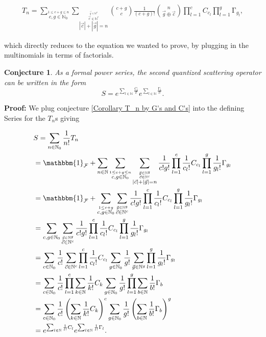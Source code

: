 \documentclass[b5paper,draft,openbib,12pt]{memoir}
\newtheorem{Conj}[Def]{Conjecture}
\newcommand{\id}{\mathbbm{1}}
\begin{document}
\begin{multline}
T_n = \sum_{\stackrel{1\le c+g\le n}{c,g\in\mathbb{N}_0}}
\sum_{\stackrel{\stackrel{\vec{g}\in\mathbb{N}^g}{\vec{c}\in\mathbb{N}^c}}{|\vec{c}| + |\vec{g}|=n}} 
\binom{c+g}{c} \frac{1}{(c+g)!} \binom{n}{\vec{g}\oplus \vec{c}}
\prod_{l=1}^c  C_{c_l} \prod_{l=1}^g \mathrm\Gamma_{g_l},
\end{multline}

which directly reduces to the equation we wanted to prove, by plugging in the multinomials in terms of
factorials. 

\begin{Conj}
As a formal power series, the second quantized scattering operator can be written in the form
\begin{equation}\label{Corollary double exp}
S= e^{\sum_{l\in\mathbb{N}} \frac{C_{l}}{l!}}
 e^{\sum_{l\in\mathbb{N}} \frac{\mathrm\Gamma_{l}}{l!}}.
\end{equation}
\end{Conj}
\textbf{Proof:} We plug conjecture \ref{Corollary T_n by G's and C's} into the defining Series for the \(T_n\)s
giving

\begin{align}
&S= \sum_{n\in\mathbb{N}_0} \frac{1}{n!} T_n \\
&=\id_{\mathcal{F}}+ \sum_{n\in\mathbb{N}} \sum_{\stackrel{1\le c+g\le n}{c,g\in\mathbb{N}_0}} 
\sum_{\stackrel{\stackrel{\vec{g}\in\mathbb{N}^g}{\vec{c}\in\mathbb{N}^c}}{|\vec{c}| + |\vec{g}|=n}} 
\frac{1}{c! g!} \prod_{l=1}^c \frac{1}{c_l!} C_{c_l} \prod_{l=1}^g \frac{1}{g_l!} \mathrm\Gamma_{g_l}\\
&=\id_{\mathcal{F}}+  \sum_{\stackrel{1\le c+g }{c,g\in\mathbb{N}_0}} 
\sum_{\stackrel{\vec{g}\in\mathbb{N}^g}{\vec{c}\in\mathbb{N}^c}} 
\frac{1}{c! g!} \prod_{l=1}^c \frac{1}{c_l!} C_{c_l} \prod_{l=1}^g \frac{1}{g_l!} \mathrm\Gamma_{g_l}\\
&=\sum_{c,g\in\mathbb{N}_0}
\sum_{\stackrel{\vec{g}\in\mathbb{N}^g}{\vec{c}\in\mathbb{N}^c}} 
\frac{1}{c! g!} \prod_{l=1}^c \frac{1}{c_l!} C_{c_l} \prod_{l=1}^g \frac{1}{g_l!} \mathrm\Gamma_{g_l}\\
&=\sum_{c\in\mathbb{N}_0} \frac{1}{c!} \sum_{\vec{c}\in\mathbb{N}^c} \prod_{l=1}^c \frac{1}{c_l!} C_{c_l}
\sum_{g\in\mathbb{N}_0} \frac{1}{g!} \sum_{\vec{g}\in\mathbb{N}^g} \prod_{l=1}^g \frac{1}{g_l!} \mathrm\Gamma_{g_l}\\
&=\sum_{c\in\mathbb{N}_0} \frac{1}{c!} \prod_{l=1}^c \sum_{k\in\mathbb{N}} \frac{1}{k!} C_{k}
\sum_{g\in\mathbb{N}_0} \frac{1}{g!}  \prod_{l=1}^g \sum_{b\in\mathbb{N}} \frac{1}{b!} \mathrm\Gamma_{b}\\
&=\sum_{c\in\mathbb{N}_0} \frac{1}{c!} \left( \sum_{k\in\mathbb{N}} \frac{1}{k!} C_{k}\right)^c
\sum_{g\in\mathbb{N}_0} \frac{1}{g!}  \left( \sum_{b\in\mathbb{N}} \frac{1}{b!} \mathrm\Gamma_{b}\right)^g\\
&=e^{\sum_{l\in\mathbb{N}} \frac{1}{l!} C_{l}} e^{\sum_{l\in\mathbb{N}} \frac{1}{l!} \mathrm\Gamma_{l}}.
\end{align}
\end{document}
